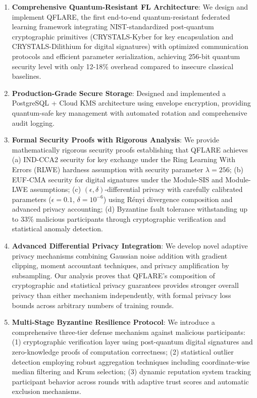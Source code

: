 \documentclass[onecolumn,11pt]{article}
\begin{document}
\begin{enumerate}
\item \textbf{Comprehensive Quantum-Resistant FL Architecture}: We design and implement QFLARE, the first end-to-end quantum-resistant federated learning framework integrating NIST-standardized post-quantum cryptographic primitives (CRYSTALS-Kyber for key encapsulation and CRYSTALS-Dilithium for digital signatures) with optimized communication protocols and efficient parameter serialization, achieving 256-bit quantum security level with only 12-18\% overhead compared to insecure classical baselines.

\item \textbf{Production-Grade Secure Storage}: Designed and implemented a PostgreSQL + Cloud KMS architecture using envelope encryption, providing quantum-safe key management with automated rotation and comprehensive audit logging.

\item \textbf{Formal Security Proofs with Rigorous Analysis}: We provide mathematically rigorous security proofs establishing that QFLARE achieves (a) IND-CCA2 security for key exchange under the Ring Learning With Errors (RLWE) hardness assumption with security parameter $\lambda = 256$; (b) EUF-CMA security for digital signatures under the Module-SIS and Module-LWE assumptions; (c) $(\epsilon, \delta)$-differential privacy with carefully calibrated parameters ($\epsilon = 0.1$, $\delta = 10^{-6}$) using Rényi divergence composition and advanced privacy accounting; (d) Byzantine fault tolerance withstanding up to 33\% malicious participants through cryptographic verification and statistical anomaly detection.

\item \textbf{Advanced Differential Privacy Integration}: We develop novel adaptive privacy mechanisms combining Gaussian noise addition with gradient clipping, moment accountant techniques, and privacy amplification by subsampling. Our analysis proves that QFLARE's composition of cryptographic and statistical privacy guarantees provides stronger overall privacy than either mechanism independently, with formal privacy loss bounds across arbitrary numbers of training rounds.

\item \textbf{Multi-Stage Byzantine Resilience Protocol}: We introduce a comprehensive three-tier defense mechanism against malicious participants: (1) cryptographic verification layer using post-quantum digital signatures and zero-knowledge proofs of computation correctness; (2) statistical outlier detection employing robust aggregation techniques including coordinate-wise median filtering and Krum selection; (3) dynamic reputation system tracking participant behavior across rounds with adaptive trust scores and automatic exclusion mechanisms.


\end{enumerate}
\end{document}
